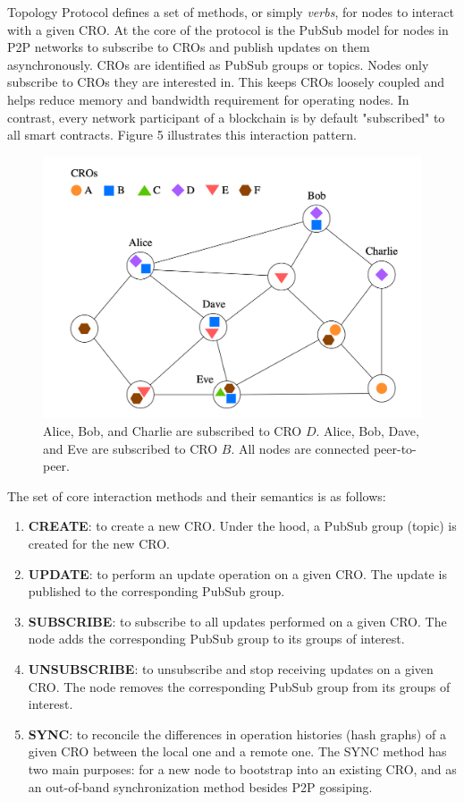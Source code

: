 \documentclass{article}
\begin{document}
Topology Protocol defines a set of methods, or simply \textit{verbs}, for nodes to interact with a given CRO. At the core of the protocol is the PubSub model for nodes in P2P networks to subscribe to CROs and publish updates on them asynchronously. CROs are identified as PubSub groups or topics. Nodes only subscribe to CROs they are interested in. This keeps CROs loosely coupled and helps reduce memory and bandwidth requirement for operating nodes. In contrast, every network participant of a blockchain is by default "subscribed" to all smart contracts. Figure 5 illustrates this interaction pattern.

\begin{figure}[htp]
    \centering
    \includegraphics[width=13cm]{fig5}
    \caption{Alice, Bob, and Charlie are subscribed to CRO $D$. Alice, Bob, Dave, and Eve are subscribed to CRO $B$. All nodes are connected peer-to-peer.}
    \label{fig:5}
\end{figure}

The set of core interaction methods and their semantics is as follows:
\begin{enumerate}
    \item \textbf{CREATE}: to create a new CRO. Under the hood, a PubSub group (topic) is created for the new CRO.
    \item \textbf{UPDATE}: to perform an update operation on a given CRO. The update is published to the corresponding PubSub group.
    \item \textbf{SUBSCRIBE}: to subscribe to all updates performed on a given CRO. The node adds the corresponding PubSub group to its groups of interest.
    \item \textbf{UNSUBSCRIBE}: to unsubscribe and stop receiving updates on a given CRO. The node removes the corresponding PubSub group from its groups of interest.
    \item \textbf{SYNC}: to reconcile the differences in operation histories (hash graphs) of a given CRO between the local one and a remote one. The SYNC method has two main purposes: for a new node to bootstrap into an existing CRO, and as an out-of-band synchronization method besides P2P gossiping.
\end{enumerate}
\end{document}
